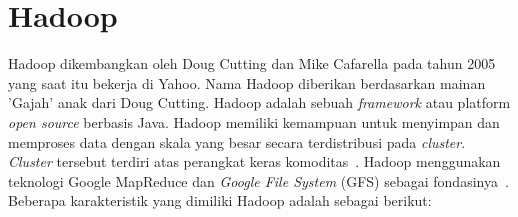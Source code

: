 \section{Hadoop}

Hadoop dikembangkan oleh Doug Cutting dan Mike Cafarella pada tahun 2005 yang saat itu bekerja di Yahoo. Nama Hadoop diberikan berdasarkan mainan 'Gajah' anak dari Doug Cutting. Hadoop adalah sebuah \textit{framework} atau platform \textit{open source} berbasis Java. Hadoop memiliki kemampuan untuk menyimpan dan memproses data dengan skala yang besar secara terdistribusi pada \textit{cluster}. \textit{Cluster} tersebut terdiri atas perangkat keras komoditas~\cite{alexholmes:04:hip}. Hadoop menggunakan teknologi Google MapReduce dan  \textit{Google File System} (GFS) sebagai fondasinya~\cite{tomwhite:05:htdg}. Beberapa karakteristik yang dimiliki Hadoop adalah sebagai berikut:


